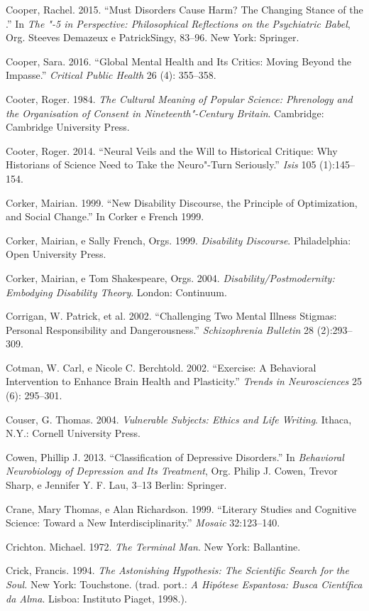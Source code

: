 {\begin{Parskip}
Cooper, Rachel. 2015. ``Must Disorders Cause Harm? The Changing Stance
of the .'' In \emph{The "-5 in Perspective: Philosophical
Reflections on the Psychiatric Babel}, Org. Steeves Demazeux e
PatrickSingy, 83--96. New York: Springer.

Cooper, Sara. 2016. ``Global Mental Health and Its Critics: Moving
Beyond the Impasse.'' \emph{Critical Public Health} 26 (4): 355--358.

Cooter, Roger. 1984. \emph{The Cultural Meaning of Popular Science:
Phrenology and the Organisation of Consent in Nineteenth"-Century
Britain}. Cambridge: Cambridge University Press.

Cooter, Roger. 2014. ``Neural Veils and the Will to Historical Critique:
Why Historians of Science Need to Take the Neuro"-Turn Seriously.''
\emph{Isis} 105 (1):145--154.

Corker, Mairian. 1999. ``New Disability Discourse, the Principle of
Optimization, and Social Change.'' In Corker e French 1999.

Corker, Mairian, e Sally French, Orgs. 1999. \emph{Disability
Discourse}. Philadelphia: Open University Press.

Corker, Mairian, e Tom Shakespeare, Orgs. 2004.
\emph{Disability/Postmodernity: Embodying Disability Theory}. London:
Continuum.

Corrigan, W. Patrick, et al. 2002. ``Challenging Two Mental Illness
Stigmas: Personal Responsibility and Dangerousness.''
\emph{Schizophrenia Bulletin} 28 (2):293--309.

Cotman, W. Carl, e Nicole C. Berchtold. 2002. ``Exercise: A Behavioral
Intervention to Enhance Brain Health and Plasticity.'' \emph{Trends in
Neurosciences} 25 (6): 295--301.

Couser, G. Thomas. 2004. \emph{Vulnerable Subjects: Ethics and Life
Writing}. Ithaca, N.Y.: Cornell University Press.

Cowen, Phillip J. 2013. ``Classification of Depressive Disorders.'' In
\emph{Behavioral Neurobiology of Depression and Its Treatment}, Org.
Philip J. Cowen, Trevor Sharp, e Jennifer Y. F. Lau, 3--13 Berlin:
Springer.

Crane, Mary Thomas, e Alan Richardson. 1999. ``Literary Studies and
Cognitive Science: Toward a New Interdisciplinarity.'' \emph{Mosaic}
32:123--140.

Crichton. Michael. 1972. \emph{The Terminal Man}. New York: Ballantine.

Crick, Francis. 1994. \emph{The Astonishing Hypothesis: The Scientific
Search for the Soul.} New York: Touchstone. (trad. port.: \emph{A
Hipótese Espantosa: Busca Científica da Alma}. Lisboa: Instituto Piaget,
1998.).


\end{Parskip}}
